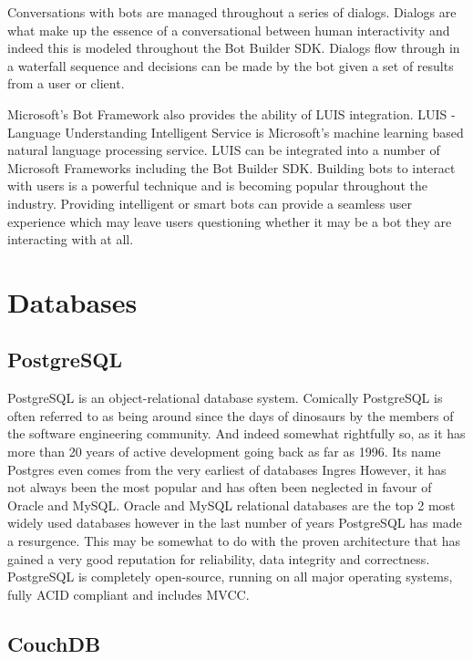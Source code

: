 Conversations with bots are managed throughout a series of dialogs. Dialogs are what make up the essence of a conversational between human interactivity and indeed this is modeled throughout the Bot Builder SDK. Dialogs flow through in a waterfall sequence and decisions can be made by the bot given a set of results from a user or client. 

Microsoft's Bot Framework also provides the ability of LUIS\cite{LUIS} integration. LUIS - Language Understanding Intelligent Service is Microsoft's machine learning based natural language processing service. LUIS can be integrated into a number of Microsoft Frameworks including the Bot Builder SDK. Building bots to interact with users is a powerful technique and is becoming popular throughout the industry. Providing intelligent or smart bots can provide a seamless user experience which may leave users questioning whether it may be a bot they are interacting with at all.

\section{Databases}
\subsection{PostgreSQL}

PostgreSQL is an object-relational database system. Comically PostgreSQL is often referred to as being around since the days of dinosaurs by the members of the software engineering community. And indeed somewhat rightfully so, as it has more than 20 years of active development going back as far as 1996. Its name Postgres even comes from the very earliest of databases Ingres\cite{postgresguide} However, it has not always been the most popular and has often been neglected in favour of Oracle and MySQL. Oracle and MySQL relational databases are the top 2 most widely used databases\cite{dbrankings} however in the last number of years PostgreSQL has made a resurgence. This may be somewhat to do with the proven architecture that has gained a very good reputation for reliability, data integrity and correctness\cite{postgres}. PostgreSQL is completely open-source, running on all major operating systems, fully ACID compliant and includes MVCC\cite{postgres}.

\subsection{CouchDB}


